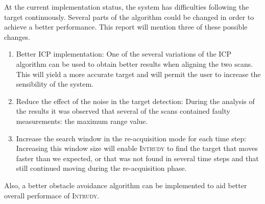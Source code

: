 \documentclass[12pt,a4paper]{scrartcl}
\newcommand{\intrudy}{\textsc{Intrudy}\xspace}
\begin{document}
At the current implementation status, the system has difficulties following the target continuously. Several parts of the algorithm could be changed in order to achieve a better performance. This report will mention three of these possible changes.
\begin{enumerate}
	\item Better ICP implementation: One of the several variations of the ICP algorithm can be used to obtain better results when aligning the two scans. This will yield a more accurate target and will permit the user to increase the sensibility of the system.

	\item Reduce the effect of the noise in the target detection: During the analysis of the results it was observed that several of the scans contained faulty measurements: the maximum range value.

	\item Increase the search window in the re-acquisition mode for each time step: Increasing this window size will enable \intrudy to find the target that moves faster than we expected, or that was not found in several time steps and that still continued moving during the re-acquisition phase.
\end{enumerate}
Also, a better obstacle avoidance algorithm can be implemented to aid better overall performace of \intrudy.


\newpage


\end{document}
